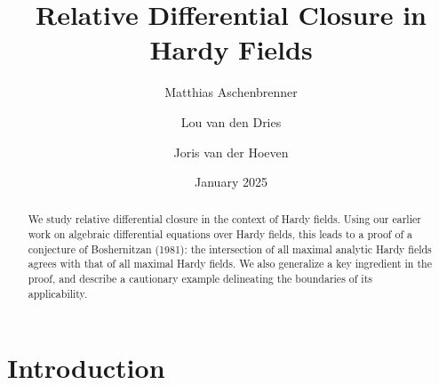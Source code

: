 \documentclass[]{amsart}
\numberwithin{equation}{section}
\theoremstyle{definition}
\theoremstyle{remark}
\begin{document}
\title{Relative Differential Closure in Hardy Fields}
\author[Aschenbrenner]{Matthias Aschenbrenner}
\address{Kurt G\"odel Research Center for Mathematical Logic\\
Universit\"at Wien\\
1090 Wien\\ Austria}

\author[van den Dries]{Lou van den Dries}
\address{Department of Mathematics\\
University of Illinois at Urbana-Cham\-paign\\
Urbana, IL 61801\\
U.S.A.}

\author[van der Hoeven]{Joris van der Hoeven}
\address{CNRS, LIX (UMR 7161)\\ 
Campus de l'\'Ecole Polytechnique\\  91120 Palaiseau \\ France}

\date{January 2025}

\begin{abstract} 
We study relative differential closure in the context of Hardy fields.
Using our earlier work on algebraic differential
equations over Hardy fields,
this leads to a proof of a conjecture of Boshernitzan (1981): the intersection of all maximal analytic Hardy fields
agrees with that of all maximal Hardy fields. 
We also generalize a key ingredient in the proof, and describe a cautionary example
delineating the boundaries of its applicability. 
\end{abstract}

 
\maketitle


\tableofcontents

\section*{Introduction}
\end{document}
